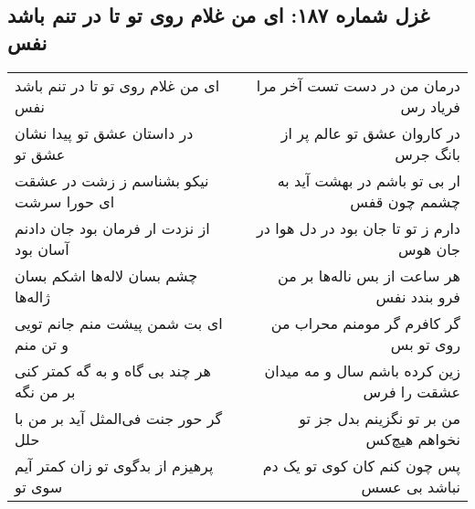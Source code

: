 \begin{center}
\section*{غزل شماره ۱۸۷: ای من غلام روی تو تا در تنم باشد نفس}
\label{sec:187}
\begin{longtable}{l p{0.5cm} r}
ای من غلام روی تو تا در تنم باشد نفس
&&
درمان من در دست تست آخر مرا فریاد رس
\\
در داستان عشق تو پیدا نشان عشق تو
&&
در کاروان عشق تو عالم پر از بانگ جرس
\\
نیکو بشناسم ز زشت در عشقت ای حورا سرشت
&&
ار بی تو باشم در بهشت آید به چشمم چون قفس
\\
از نزدت ار فرمان بود جان دادنم آسان بود
&&
دارم ز تو تا جان بود در دل هوا در جان هوس
\\
چشم بسان لاله‌ها اشکم بسان ژاله‌ها
&&
هر ساعت از بس ناله‌ها بر من فرو بندد نفس
\\
ای بت شمن پیشت منم جانم تویی و تن منم
&&
گر کافرم گر مومنم محراب من روی تو بس
\\
هر چند بی گاه و به گه کمتر کنی بر من نگه
&&
زین کرده باشم سال و مه میدان عشقت را فرس
\\
گر حور جنت فی‌المثل آید بر من با حلل
&&
من بر تو نگزینم بدل جز تو نخواهم هیچ‌کس
\\
پرهیزم از بدگوی تو زان کمتر آیم سوی تو
&&
پس چون کنم کان کوی تو یک دم نباشد بی عسس
\\
\end{longtable}
\end{center}
